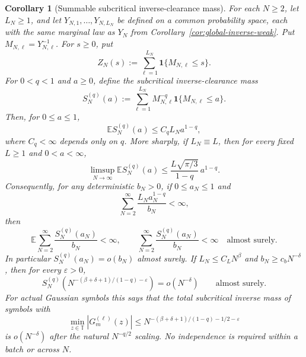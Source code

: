 \documentclass[11pt]{amsart}
\numberwithin{equation}{section}
\newtheorem{corollary}[theorem]{Corollary}
\theoremstyle{definition}
\theoremstyle{remark}
\newcommand{\T}{\mathbb T}
\newcommand{\Exp}{\mathbb E}
\newcommand{\eps}{\varepsilon}
\begin{document}
\begin{corollary}[Summable subcritical inverse-clearance mass]
\label{cor:global-inverse-family-subcritical-sum}
For each \(N\ge2\), let \(L_N\ge1\), and let
\(Y_{N,1},\ldots,Y_{N,L_N}\) be defined on a common probability space, each with
the same marginal law as \(Y_N\) from
Corollary~\ref{cor:global-inverse-weak}.  Put \(M_{N,\ell}=Y_{N,\ell}^{-1}\).
For \(s\ge0\), put
\[
  Z_N(s):=\sum_{\ell=1}^{L_N}\mathbf1\{M_{N,\ell}\le s\}.
\]
For \(0<q<1\) and \(a\ge0\), define the subcritical inverse-clearance mass
\[
  S_N^{(q)}(a):=
  \sum_{\ell=1}^{L_N}M_{N,\ell}^{-q}\mathbf1\{M_{N,\ell}\le a\}.
\]
Then, for \(0\le a\le1\),
\[
  \Exp S_N^{(q)}(a)\le C_q L_Na^{1-q},
\]
where \(C_q<\infty\) depends only on \(q\).  More sharply, if \(L_N\equiv L\),
then for every fixed \(L\ge1\) and \(0<a<\infty\),
\[
  \limsup_{N\to\infty}\Exp S_N^{(q)}(a)
  \le
  \frac{L\sqrt{\pi/3}}{1-q}\,a^{1-q}.
\]
Consequently, for any deterministic \(b_N>0\), if \(0\le a_N\le1\) and
\[
  \sum_{N=2}^\infty \frac{L_Na_N^{1-q}}{b_N}<\infty,
\]
then
\[
  \Exp\sum_{N=2}^\infty \frac{S_N^{(q)}(a_N)}{b_N}<\infty,
  \qquad
  \sum_{N=2}^\infty \frac{S_N^{(q)}(a_N)}{b_N}<\infty
  \quad\text{almost surely}.
\]
In particular \(S_N^{(q)}(a_N)=o(b_N)\) almost surely.  If
\(L_N\le C_LN^\beta\) and \(b_N\ge c_bN^{-\delta}\), then for every \(\eps>0\),
\[
  S_N^{(q)}\!\left(
    N^{-(\beta+\delta+1)/(1-q)-\eps}
  \right)
  =
  o\!\left(N^{-\delta}\right)
  \qquad\text{almost surely}.
\]
For actual Gaussian symbols this says that the total subcritical inverse mass of
symbols with
\[
  \min_{z\in\T}|G_m^{(\ell)}(z)|
  \le
  N^{-(\beta+\delta+1)/(1-q)-1/2-\eps}
\]
is \(o(N^{-\delta})\) after the natural \(N^{-q/2}\) scaling.  No independence
is required within a batch or across \(N\).
\end{corollary}
\end{document}
